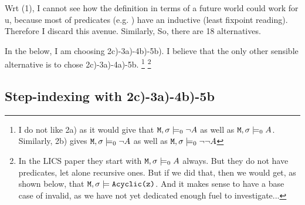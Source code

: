 \documentclass[acmsmall,screen]{acmart}
\begin{document}
Wrt (1), I cannot see how the definition in terms of a future world could  work for u, because most of  predicates (e.g. ) have an inductive (least fixpoint reading). Therefore I discard this avenue. Similarly,
So, there are 18 alternatives.

In the below, I am choosing 2c)-3a)-4b)-5b). I believe that the only other sensible alternative is to chose 2c)-3a)-4a)-5b.
\footnote{I do not like 2a)  as it would give that  ${\mbox{\tt{M}}}, \sigma \models_0 \neg   A$ as well as ${\mbox{\tt{M}}}, \sigma \models_0    A$. Similarly, 2b) gives ${\mbox{\tt{M}}}, \sigma \models_0  \neg A$ as well as ${\mbox{\tt{M}}}, \sigma \models_0 \neg \neg A$}
\footnote{In the LICS paper they start with ${\mbox{\tt{M}}}, \sigma \models_0 A$ always. But they do not have predicates, let alone recursive ones. But if we did that, then we would get, as shown below, that ${\mbox{\tt{M}}}, \sigma \models {\mbox{\tt{Acyclic(z)}}}$. And it makes sense to have a base case of invalid, as we have not yet dedicated enough fuel to investigate...
}

\subsection{Step-indexing with 2c)-3a)-4b)-5b}
\end{document}
